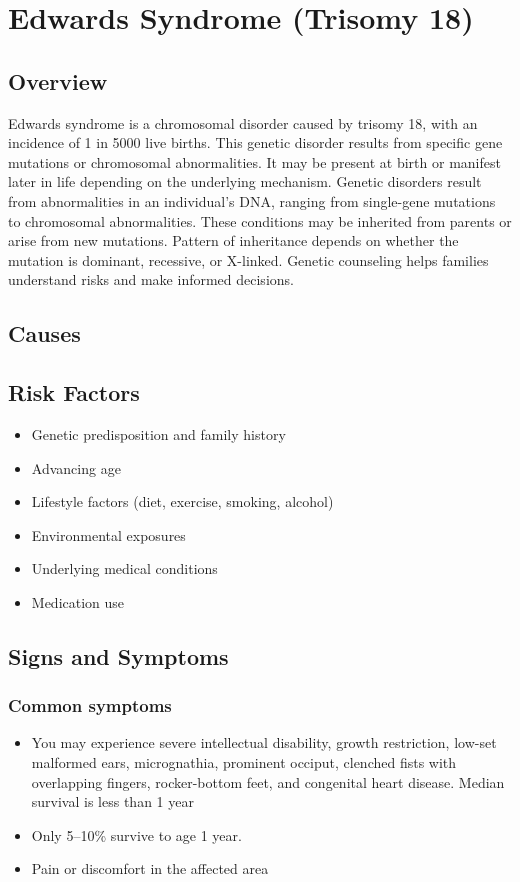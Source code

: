 \chapter{Edwards Syndrome (Trisomy 18)}
\label{sec:Edwards Syndrome}

\section{Overview}
Edwards syndrome is a chromosomal disorder caused by trisomy 18, with an incidence of 1 in 5000 live births. This genetic disorder results from specific gene mutations or chromosomal abnormalities. It may be present at birth or manifest later in life depending on the underlying mechanism. Genetic disorders result from abnormalities in an individual's DNA, ranging from single-gene mutations to chromosomal abnormalities. These conditions may be inherited from parents or arise from new mutations. Pattern of inheritance depends on whether the mutation is dominant, recessive, or X-linked. Genetic counseling helps families understand risks and make informed decisions.
\section{Causes}
\section{Risk Factors}

\begin{itemize}[noitemsep]
  \item Genetic predisposition and family history
  \item Advancing age
  \item Lifestyle factors (diet, exercise, smoking, alcohol)
  \item Environmental exposures
  \item Underlying medical conditions
  \item Medication use
\end{itemize}
\section{Signs and Symptoms}

\subsection{Common symptoms}
\begin{itemize}[noitemsep]
  \item You may experience severe intellectual disability, growth restriction, low-set malformed ears, micrognathia, prominent occiput, clenched fists with overlapping fingers, rocker-bottom feet, and congenital heart disease. Median survival is less than 1 year
  \item Only 5--10\% survive to age 1 year.
  \item Pain or discomfort in the affected area
  \end{itemize}

